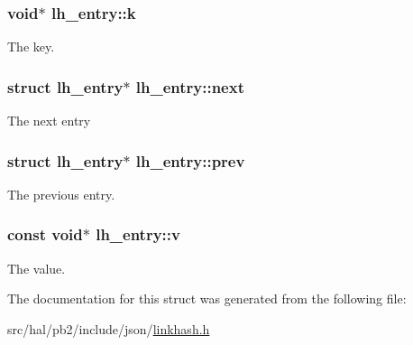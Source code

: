 \subsubsection[{\texorpdfstring{k}{k}}]{\setlength{\rightskip}{0pt plus 5cm}void$\ast$ lh\+\_\+entry\+::k}\hypertarget{structlh__entry_a6b176b3582c9cf553af6431750f5c3b6}{}\label{structlh__entry_a6b176b3582c9cf553af6431750f5c3b6}
The key. 
\subsubsection[{\texorpdfstring{next}{next}}]{\setlength{\rightskip}{0pt plus 5cm}struct {\bf lh\+\_\+entry}$\ast$ lh\+\_\+entry\+::next}\hypertarget{structlh__entry_a7c40c46e72d9a0ba071a8d49d535bc67}{}\label{structlh__entry_a7c40c46e72d9a0ba071a8d49d535bc67}
The next entry 
\subsubsection[{\texorpdfstring{prev}{prev}}]{\setlength{\rightskip}{0pt plus 5cm}struct {\bf lh\+\_\+entry}$\ast$ lh\+\_\+entry\+::prev}\hypertarget{structlh__entry_a6fb9c3de01fb5af67d8d429921cc6a3b}{}\label{structlh__entry_a6fb9c3de01fb5af67d8d429921cc6a3b}
The previous entry. 
\subsubsection[{\texorpdfstring{v}{v}}]{\setlength{\rightskip}{0pt plus 5cm}const void$\ast$ lh\+\_\+entry\+::v}\hypertarget{structlh__entry_a1b676732ab2ad3eeaedf6ec60a6a0835}{}\label{structlh__entry_a1b676732ab2ad3eeaedf6ec60a6a0835}
The value. 

The documentation for this struct was generated from the following file\+:\begin{DoxyCompactItemize}
\item 
src/hal/pb2/include/json/\hyperlink{linkhash_8h}{linkhash.\+h}\end{DoxyCompactItemize}
